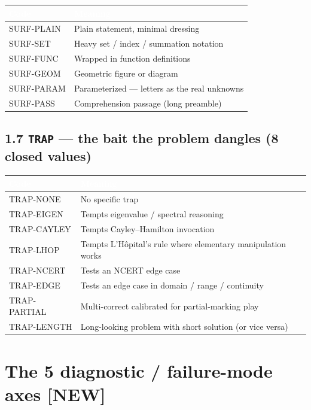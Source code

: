 \documentclass[11pt,letterpaper]{article}
\newcommand{\cd}[1]{\texttt{\small #1}}
\newcommand{\NEW}{\textcolor{accent}{\textbf{[NEW]}}}
\begin{document}
\begin{tabular}{|p{2.5cm}|p{13.0cm}|}
\hline
\rowcolor{headergray}\textcolor{white}{\textbf{Code}} & \textcolor{white}{\textbf{Meaning}} \\
\hline
SURF-PLAIN & Plain statement, minimal dressing \\
\rowcolor{altrow}SURF-SET & Heavy set / index / summation notation \\
SURF-FUNC & Wrapped in function definitions \\
\rowcolor{altrow}SURF-GEOM & Geometric figure or diagram \\
SURF-PARAM & Parameterized --- letters as the real unknowns \\
\rowcolor{altrow}SURF-PASS & Comprehension passage (long preamble) \\
\hline
\end{tabular}

\subsection*{1.7 \cd{TRAP} --- the bait the problem dangles (8 closed values)}

\begin{tabular}{|p{2.5cm}|p{13.0cm}|}
\hline
\rowcolor{headergray}\textcolor{white}{\textbf{Code}} & \textcolor{white}{\textbf{Meaning}} \\
\hline
TRAP-NONE & No specific trap \\
\rowcolor{altrow}TRAP-EIGEN & Tempts eigenvalue / spectral reasoning \\
TRAP-CAYLEY & Tempts Cayley--Hamilton invocation \\
\rowcolor{altrow}TRAP-LHOP & Tempts L'H\^opital's rule where elementary manipulation works \\
TRAP-NCERT & Tests an NCERT edge case \\
\rowcolor{altrow}TRAP-EDGE & Tests an edge case in domain / range / continuity \\
TRAP-PARTIAL & Multi-correct calibrated for partial-marking play \\
\rowcolor{altrow}TRAP-LENGTH & Long-looking problem with short solution (or vice versa) \\
\hline
\end{tabular}

\newpage
\section{The 5 diagnostic / failure-mode axes \NEW{}}\label{sec:diag}
\end{document}
